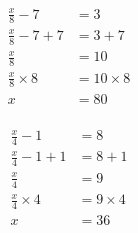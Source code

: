 \documentclass[12pt]{article}
\newcounter{minipagecount}
\begin{document}
\begin{multicols}{2}
\begin{minipage}[t]{0.45\textwidth}
    \raggedright %
    \begin{align*} %
        \frac{x}{8} - 7 &= 3\\
        \frac{x}{8} - 7 + 7 &= 3 + 7\\
        \frac{x}{8} &= 10\\
        \frac{x}{8} \times8 &= 10 \times8\\
        x &= 80\\
    \end{align*}
\end{minipage} %
\noindent{(\theminipagecount)}\hspace{0.1mm} %
\begin{minipage}[t]{0.45\textwidth} %
    \vspace{-26pt}  %
    \raggedright %
    \begin{align*} %
        \frac{x}{4} - 1 &= 8\\
        \frac{x}{4} - 1 + 1 &= 8 + 1\\
        \frac{x}{4} &= 9\\
        \frac{x}{4} \times4 &= 9 \times4\\
        x &= 36\\
    \end{align*}
\end{minipage} %
\noindent{(\theminipagecount)}\hspace{0.1mm} %
\begin{minipage}[t]{0.45\textwidth} %

\end{minipage}
\end{multicols}
\end{document}

